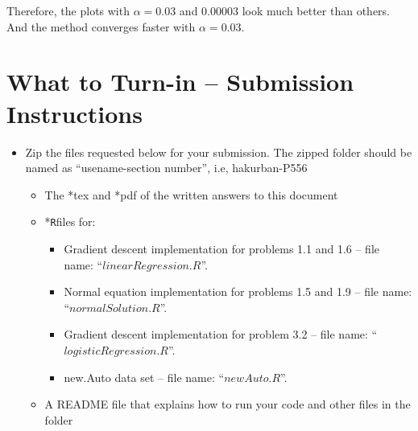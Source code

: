 \documentclass[a4paper,12pt]{article}
\newcommand{\quotes}[1]{``#1''}
\begin{document}
Therefore, the plots with $\alpha=0.03$ and $0.00003$ look much better than others. And the method converges faster with $\alpha=0.03$.









































       

\newpage
\section*{What to Turn-in -- Submission Instructions}
\begin{itemize}
\item  Zip the files requested below for your submission. The zipped folder should be named as \quotes{usename-section number}, i.e, hakurban-P556
\begin{itemize}
\item The *tex and *pdf of the written answers to this document
\item *\texttt{R}files for:
\begin{itemize}
\item Gradient descent implementation for  problems 1.1 and 1.6 -- file name: \quotes{$linearRegression.R$}.
\item  Normal equation implementation for  problems 1.5 and 1.9  -- file name: \quotes{$normalSolution.R$}.
\item Gradient descent implementation for problem 3.2 -- file name: \quotes{$logisticRegression.R$}.
\item new.Auto data set -- file name: \quotes{$newAuto.R$}.
\end{itemize}
\item A README file that explains how to run your code and other files in the folder
\end{itemize}
\end{itemize}
\end{document}
